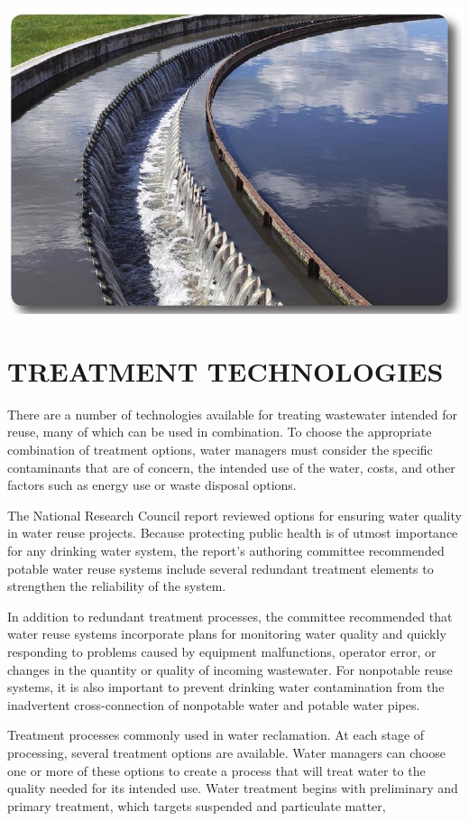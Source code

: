 \documentclass[10pt]{article}
\begin{document}
\includegraphics[max width=\textwidth]{2022_11_05_93277ca2de7ec5580550g-06}

\section{TREATMENT TECHNOLOGIES}
There are a number of technologies available for treating wastewater intended for reuse, many of which can be used in combination. To choose the appropriate combination of treatment options, water managers must consider the specific contaminants that are of concern, the intended use of the water, costs, and other factors such as energy use or waste disposal options.

The National Research Council report reviewed options for ensuring water quality in water reuse projects. Because protecting public health is of utmost importance for any drinking water system, the report's authoring committee recommended potable water reuse systems include several redundant treatment elements to strengthen the reliability of the system.

In addition to redundant treatment processes, the committee recommended that water reuse systems incorporate plans for monitoring water quality and quickly responding to problems caused by equipment malfunctions, operator error, or changes in the quantity or quality of incoming wastewater. For nonpotable reuse systems, it is also important to prevent drinking water contamination from the inadvertent cross-connection of nonpotable water and potable water pipes.

Treatment processes commonly used in water reclamation. At each stage of processing, several treatment options are available. Water managers can choose one or more of these options to create a process that will treat water to the quality needed for its intended use. Water treatment begins with preliminary and primary treatment, which targets suspended and particulate matter,
\end{document}
